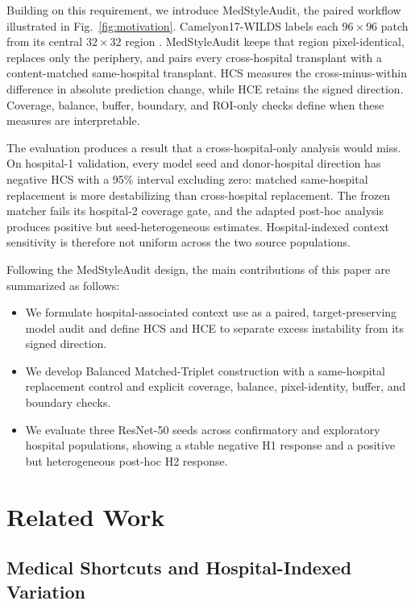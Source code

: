 \documentclass[notspecified,article,submit,moreauthors]{Definitions/mdpi}
\begin{document}
Building on this requirement, we introduce MedStyleAudit, the paired workflow
illustrated in Fig.~\ref{fig:motivation}. Camelyon17-WILDS labels each
$96\times96$ patch from its central $32\times32$ region
\cite{bandi2018camelyon17,koh2021wilds}. MedStyleAudit keeps that region
pixel-identical, replaces only the periphery, and pairs every cross-hospital
transplant with a content-matched same-hospital transplant. HCS measures the
cross-minus-within difference in absolute prediction change, while HCE retains
the signed direction. Coverage, balance, buffer, boundary, and ROI-only checks
define when these measures are interpretable.

The evaluation produces a result that a cross-hospital-only analysis would
miss. On hospital-1 validation, every model seed and donor-hospital direction
has negative HCS with a 95\% interval excluding zero: matched same-hospital
replacement is more destabilizing than cross-hospital replacement. The frozen
matcher fails its hospital-2 coverage gate, and the adapted post-hoc analysis
produces positive but seed-heterogeneous estimates. Hospital-indexed context
sensitivity is therefore not uniform across the two source populations.

\begin{samepage}
Following the MedStyleAudit design, the main contributions of this paper are
summarized as follows:
\begin{itemize}
    \item We formulate hospital-associated context use as a paired,
    target-preserving model audit and define HCS and HCE to separate excess
    instability from its signed direction.
    \item We develop Balanced Matched-Triplet construction with a
    same-hospital replacement control and explicit coverage, balance,
    pixel-identity, buffer, and boundary checks.
    \item We evaluate three ResNet-50 seeds across confirmatory and exploratory
    hospital populations, showing a stable negative H1 response and a positive
    but heterogeneous post-hoc H2 response.
\end{itemize}
\end{samepage}

\section{Related Work}

\subsection{Medical Shortcuts and Hospital-Indexed Variation}
\end{document}
